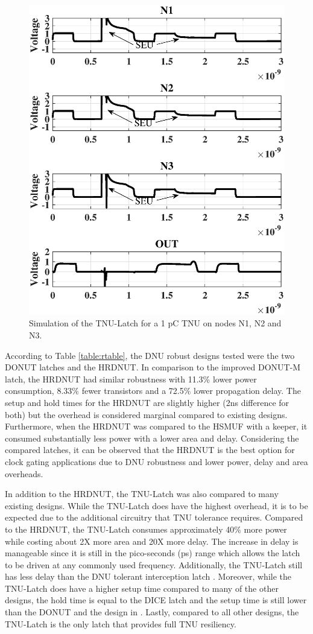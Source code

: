 \begin{figure}[!htbp]
	\centering
	\includegraphics[trim = 0mm 15mm 0mm 14mm, clip, width=0.70\linewidth]{Figures/largechargetnu}
	\caption{Simulation of the TNU-Latch for a 1 pC TNU on nodes N1, N2 and N3.}
	\label{TNULarge_fig}
\end{figure}

According to Table \ref{table:rtable}, the DNU robust designs tested were the two DONUT latches and the HRDNUT. In comparison to the improved DONUT-M latch, the HRDNUT had similar robustness with 11.3\% lower power consumption, 8.33\% fewer transistors and a 72.5\% lower propagation delay. The setup and hold times for the HRDNUT are slightly higher (2ns difference for both) but the overhead is considered marginal compared to existing designs. Furthermore, when the HRDNUT was compared to the HSMUF with a keeper, it consumed substantially less power with a lower area and delay. Considering the compared latches, it can be observed that the HRDNUT is the best option for clock gating applications due to DNU robustness and lower power, delay and area overheads.

In addition to the HRDNUT, the TNU-Latch was also compared to many existing designs. While the TNU-Latch does have the highest overhead, it is to be expected due to the additional circuitry that TNU tolerance requires. Compared to the HRDNUT, the TNU-Latch consumes approximately 40\% more power while costing about 2X more area and 20X more delay. The increase in delay is manageable since it is still in the pico-seconds (ps) range which allows the latch to be driven at any commonly used frequency. Additionally, the TNU-Latch still has less delay than the DNU tolerant interception latch \cite{Inter}. Moreover, while the TNU-Latch does have a higher setup time compared to many of the other designs, the hold time is equal to the DICE latch and the setup time is still lower than the DONUT and the design in \cite{Inter}. Lastly, compared to all other designs, the TNU-Latch is the only latch that provides full TNU resiliency.